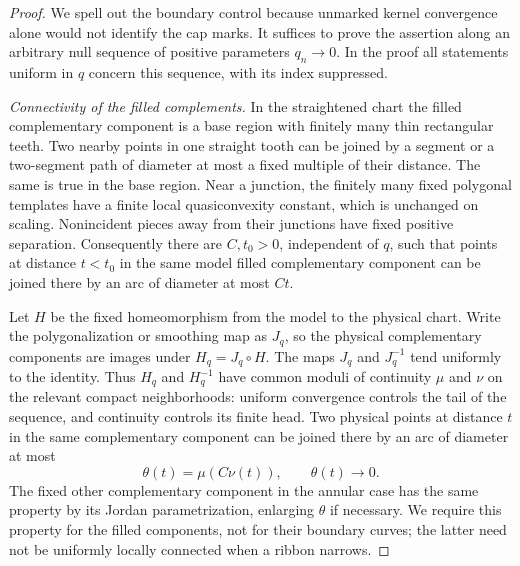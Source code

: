 \documentclass[11pt]{article}
\theoremstyle{definition}
\theoremstyle{remark}
\numberwithin{equation}{section}
\begin{document}
\begin{proof}
We spell out the boundary control because unmarked kernel convergence
alone would not identify the cap marks.  It suffices to prove the
assertion along an arbitrary null sequence of positive parameters
$q_n\to0$.  In the proof all statements uniform in $q$ concern this
sequence, with its index suppressed.

\emph{Connectivity of the filled complements.}
In the straightened chart the filled complementary component is a
base region with finitely many thin rectangular teeth.  Two nearby
points in one straight tooth can be joined by a segment or a
two-segment path of diameter at most a fixed multiple of their
distance.  The same is true in the base region.  Near a junction,
the finitely many fixed polygonal templates have a finite local
quasiconvexity constant, which is unchanged on scaling.  Nonincident
pieces away from their junctions have fixed positive separation.
Consequently there are $C,t_0>0$, independent of $q$, such that points
at distance $t<t_0$ in the same model filled complementary component
can be joined there by an arc of diameter at most $Ct$.

Let $H$ be the fixed homeomorphism from the model to the physical
chart.  Write the polygonalization or smoothing map as $J_q$, so the
physical complementary components are images under $H_q=J_q\circ H$.
The maps $J_q$ and $J_q^{-1}$ tend uniformly to the identity.  Thus
$H_q$ and $H_q^{-1}$ have common moduli of continuity $\mu$ and $\nu$
on the relevant compact neighborhoods: uniform convergence controls
the tail of the sequence, and continuity controls its finite head.
Two physical points at distance
$t$ in the same complementary component can be joined there by an arc
of diameter at most
\begin{equation}\label{if:complement-modulus}
                 \theta(t)=\mu(C\nu(t)),\qquad \theta(t)\longrightarrow0.
\end{equation}
The fixed other complementary component in the annular case has the
same property by its Jordan parametrization, enlarging $\theta$ if
necessary.  We require this property for the filled components, not
for their boundary curves; the latter need not be uniformly locally
connected when a ribbon narrows.


\end{proof}
\end{document}
